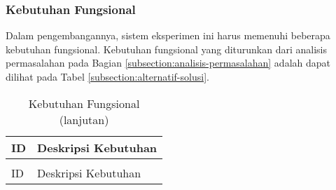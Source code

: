 
\subsubsection{Kebutuhan Fungsional}
\label{subsubsection:functional-requirements}

Dalam pengembangannya, sistem eksperimen ini harus memenuhi beberapa kebutuhan fungsional. Kebutuhan fungsional yang diturunkan dari analisis permasalahan pada Bagian \ref{subsection:analisis-permasalahan} adalah dapat dilihat pada Tabel \ref{subsection:alternatif-solusi}.

\begin{longtable}{|l|p{13cm}|}
	\caption{Kebutuhan Fungsional}
	\label{tab:functional-requirements}                                                                                                                       \\
	\hline
	\rowcolor{black!10} ID & Deskripsi Kebutuhan                                                                                                              \\ \hline
	\endfirsthead

	\caption[]{Kebutuhan Fungsional (lanjutan)}                                                                                                               \\
	\hline
	\rowcolor{black!10} ID & Deskripsi Kebutuhan                                                                                                              \\ \hline
	\endhead


\end{longtable}
